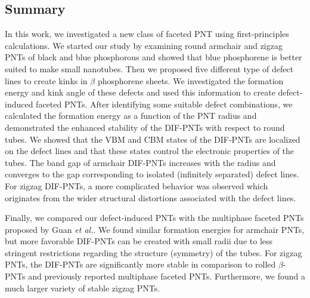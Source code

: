 \subsection{Summary}
In this work, we investigated a new class of faceted PNT using first-principles calculations. We started our study by examining round armchair and zigzag PNTs of black and blue phosphorous and showed that blue phosphorene is better suited to make small nanotubes. Then we proposed five different type of defect lines to create kinks in $\beta$ phosphorene sheets. We investigated the formation energy and kink angle of these defects and used this information to create defect-induced faceted PNTs. After identifying some suitable defect combinations, we calculated the formation energy as a function of the PNT radius and demonstrated the enhanced stability of the DIF-PNTs with respect to round tubes. We showed that the VBM and CBM states of the DIF-PNTs are localized on the defect lines and that these states control the electronic properties of the tubes. The band gap of armchair DIF-PNTs increases with the radius and converges to the gap corresponding to isolated (infinitely separated) defect lines. For zigzag DIF-PNTs, a more complicated behavior was observed which originates from the wider structural distortions associated with the defect lines. 

Finally, we compared our defect-induced PNTs with the multiphase faceted PNTs proposed by Guan \textit{et al.}\cite{Guan2014a}. We found similar formation energies for armchair PNTs, but more favorable DIF-PNTs can be created with small radii due to less stringent restrictions regarding the structure (symmetry) of the tubes. For zigzag PNTs, the DIF-PNTs are significantly more stable in comparison to rolled $\beta$-PNTs and previously reported multiphase faceted PNTs. Furthermore, we found a much larger variety of stable zigzag PNTs.